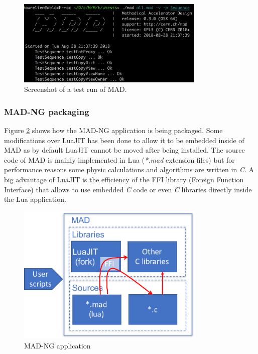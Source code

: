\begin{figure}[H]
    \centering
	\includegraphics[width=0.8\textwidth]{./Images/mad-screenshot}
    \caption{Screenshot of a test run of MAD.}
    \label{fig:mad-screnshot}
\end{figure}

\subsubsection{MAD-NG packaging}
\label{Subsec:mad-pk}

Figure \ref{fig:mad} shows how the MAD-NG application is being packaged. Some
modifications over LuaJIT has been done to allow it to be embedded inside of MAD
as by default LuaJIT cannot be moved after being installed.
The source code of MAD is mainly implemented in Lua (\emph{*.mad} extension
files) but for performance reasons some physic calculations and algorithms are
written in \emph{C}. A big advantage of LuaJIT is the efficiency of the FFI
library (Foreign Function Interface) that allows to use embedded \emph{C} code
or even \emph{C} libraries directly inside the Lua application.

\begin{figure}[H]
    \centering
	\includegraphics[width=9cm]{./Images/MAD.pdf}
    \caption{MAD-NG application}
    \label{fig:mad}
\end{figure}

